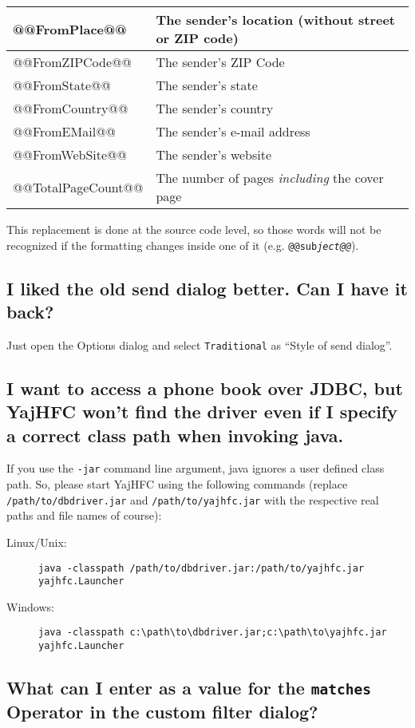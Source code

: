 \documentclass[a4paper,10pt]{scrartcl}
\begin{document}
\begin{center}
\begin{tabular}{|l|p{}|}
\ttfamily @@FromPlace@@ & The sender's  location (without street or ZIP code)\\\hline
\ttfamily @@FromZIPCode@@ & The sender's  ZIP Code \\\hline
\ttfamily @@FromState@@ & The sender's  state\\\hline
\ttfamily @@FromCountry@@ & The sender's  country\\\hline
\ttfamily @@FromEMail@@ & The sender's  e-mail address\\\hline
\ttfamily @@FromWebSite@@ & The sender's website\\\hline
\ttfamily @@TotalPageCount@@ & The number of pages \textit{including} the cover page \\\hline
\end{tabular}
\end{center}

This replacement is done at the source code level, so those words will not be recognized if the formatting changes inside one of it (e.g. \texttt{@@sub\textit{ject@@}}).

\subsection{I liked the old send dialog better. Can I have it back?}

Just open the Options dialog and select \texttt{Traditional} as ``Style of send dialog''.

\subsection{I want to access a phone book over JDBC, but YajHFC won't find the driver even if I specify a correct class path when invoking java.}

If you use the \texttt{-jar} command line argument, java ignores a user defined class path.
So, please start YajHFC using the following commands (replace \texttt{/path/to/dbdriver.jar} and \texttt{/path/to/yajhfc.jar} with the respective real paths and file names of course):
\begin{description}
\item [Linux/Unix:] \verb#java -classpath /path/to/dbdriver.jar:/path/to/yajhfc.jar yajhfc.Launcher#
\item [Windows:] \verb#java -classpath c:\path\to\dbdriver.jar;c:\path\to\yajhfc.jar yajhfc.Launcher#
\end{description}

\subsection{What can I enter as a value for the \texttt{matches} Operator in the custom filter dialog?}
\end{document}
